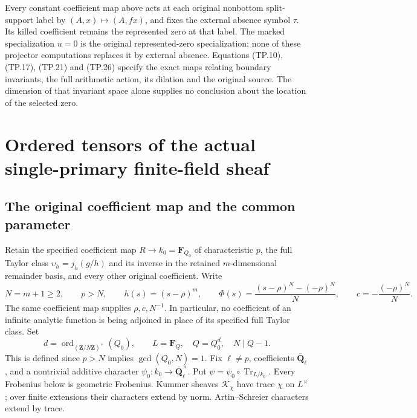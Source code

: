 Every constant coefficient map above acts at each original
nonbottom split-support label by \((A,x)\mapsto(A,fx)\),
and fixes the external absence symbol \(\tau\). Its killed
coefficient remains the represented zero at that label.
The marked specialization \(u=0\) is the original
represented-zero specialization; none of these projector
computations replaces it by external absence. Equations
(TP.10), (TP.17), (TP.21) and (TP.26) specify the exact maps
relating boundary invariants, the full arithmetic action,
its dilation and the original source. The dimension of
that invariant space alone supplies no conclusion about
the location of the selected zero.

\section{Ordered tensors of the actual single-primary finite-field sheaf}
\label{CFStage:sec:TPF}

\subsection{The original coefficient map and the common parameter}

Retain the specified coefficient map \(R\to k_0=\mathbf F_{Q_0}\)
of characteristic \(p\), the full Taylor class
\(\upsilon_h=j_h(g/h)\) and its inverse in the retained
\(m\)-dimensional remainder basis, and every other original
coefficient. Write
\[
 N=m+1\ge2,\qquad p>N,\qquad
 h(s)=(s-\rho)^m,\qquad
 \Phi(s)=\frac{(s-\rho)^N-(-\rho)^N}{N},\qquad
 c=-\frac{(-\rho)^N}{N}.
 \tag{TPF.1}\label{CFStage:eq:TPF1}
\]
The same coefficient map supplies \(\rho,c,N^{-1}\). In
particular, no coefficient of an infinite analytic function
is being adjoined in place of its specified full Taylor class.
Set
\[
 d=\operatorname{ord}_{(\mathbf Z/N\mathbf Z)^\times}(Q_0),
 \qquad L=\mathbf F_Q,\quad Q=Q_0^d,\quad N\mid Q-1.
 \tag{TPF.2}\label{CFStage:eq:TPF2}
\]
This is defined since \(p>N\) implies \(\gcd(Q_0,N)=1\).
Fix \(\ell\ne p\), coefficients \(\overline{\mathbf Q}_\ell\),
and a nontrivial additive character \(\psi_0:k_0\to
\overline{\mathbf Q}_\ell^\times\). Put
\(\psi=\psi_0\circ\operatorname{Tr}_{L/k_0}\).
Every Frobenius below is geometric Frobenius. Kummer sheaves
\(\mathcal K_\chi\) have trace \(\chi\) on \(L^\times\);
over finite extensions their characters extend by norm.
Artin--Schreier characters extend by trace.

